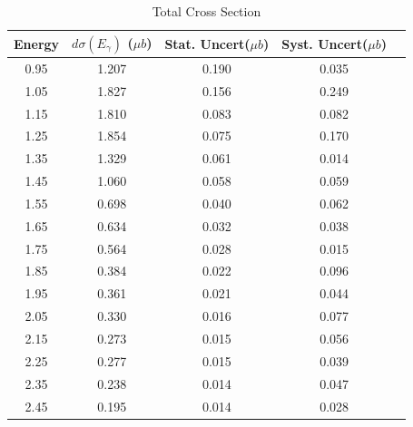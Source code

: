 \documentclass[prb,10pt,twocolumn,tightenlines,superscriptaddress]{revtex4-1}
\begin{document}
\begin{table}[h]
\centering
\caption{Total Cross Section}
\label{tab:diffcross1}
\begin{tabular}{|c|c|c|c|c|}
\hline
 {\bf Energy} &  {\bf $d\sigma(E_{\gamma})$ ($\mu b$)} & {\bf Stat. Uncert($\mu b$)} & {\bf Syst. Uncert($\mu b$)} \\ \hline
 0.95 &  1.207  &  0.190  &  0.035   \\ \hline
 1.05 &  1.827  &  0.156  &  0.249   \\ \hline
 1.15 &  1.810  &  0.083  &  0.082   \\ \hline
 1.25 &  1.854  &  0.075  &  0.170   \\ \hline
 1.35 &  1.329  &  0.061  &  0.014   \\ \hline
 1.45 &  1.060  &  0.058  &  0.059   \\ \hline
 1.55 &  0.698  &  0.040  &  0.062   \\ \hline
 1.65 &  0.634  &  0.032  &  0.038   \\ \hline
 1.75 &  0.564  &  0.028  &  0.015   \\ \hline
 1.85 &  0.384  &  0.022  &  0.096   \\ \hline
 1.95 &  0.361  &  0.021  &  0.044   \\ \hline
 2.05 &  0.330  &  0.016  &  0.077   \\ \hline
 2.15 &  0.273  &  0.015  &  0.056   \\ \hline
 2.25 &  0.277  &  0.015  &  0.039   \\ \hline
 2.35 &  0.238  &  0.014  &  0.047   \\ \hline
 2.45 &  0.195  &  0.014  &  0.028   \\ \hline
\end{tabular}
\end{table}
\end{document}
